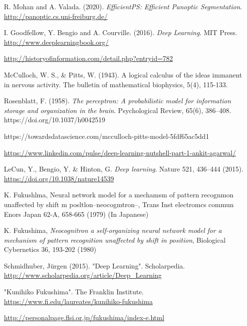 

\begin{thebibliography}{}



 R. Mohan and A. Valada. (2020). \textit{EfficientPS: Efficient Panoptic Segmentation}. \url{http://panoptic.cs.uni-freiburg.de/}

 I. Goodfellow, Y. Bengio and A. Courville. (2016). \textit{Deep Learning}. MIT Press. \url{http://www.deeplearningbook.org/}



 \url{http://historyofinformation.com/detail.php?entryid=782}

 McCulloch, W. S., \& Pitts, W. (1943). A logical calculus of the ideas immanent in nervous activity. The bulletin of mathematical biophysics, 5(4), 115-133.

 Rosenblatt, F. (1958). \textit{The perceptron: A probabilistic model for information storage and organization in the brain}. Psychological Review, 65(6), 386–408. https://doi.org/10.1037/h0042519

 https://towardsdatascience.com/mcculloch-pitts-model-5fdf65ac5dd1

 \url{https://www.linkedin.com/pulse/deep-learning-nutshell-part-1-ankit-agarwal/}

 LeCun, Y., Bengio, Y. & Hinton, G. \textit{Deep learning}. Nature 521, 436–444 (2015). \url{https://doi.org/10.1038/nature14539}

 K. Fukushlma, Neural network model for a mechamsm
of pattern recognmon unaffected by shift m
posltlon--neocogmtron--, Trans Inst electromcs commun
Enors Japan 62-A, 658-665 (1979) (In Japanese)

 K. Fukushima, \textit{Neocognitron a self-organizing neural
network model for a mechanism of pattern recognition
unaffected by shift in position}, Biological Cybernetics 36,
193-202 (1980)

 Schmidhuber, Jürgen (2015). "Deep Learning". Scholarpedia. \url{http://www.scholarpedia.org/article/Deep_Learning}

 "Kunihiko Fukushima". The Franklin Institute. \url{https://www.fi.edu/laureates/kunihiko-fukushima}

 \url{http://personalpage.flsi.or.jp/fukushima/index-e.html}


\end{thebibliography}
